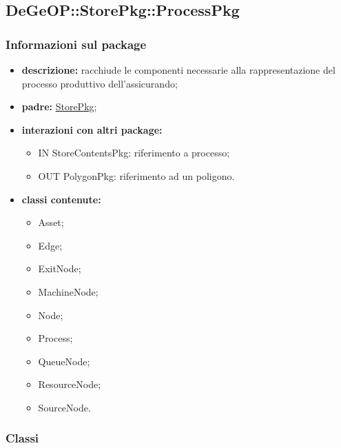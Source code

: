 \subsection{DeGeOP::StorePkg::ProcessPkg}
\label{pkg::ProcessPkg}
\subsubsection{Informazioni sul package}
\begin{itemize}
	\item \textbf{descrizione:} racchiude le componenti necessarie alla rappresentazione del processo produttivo dell'assicurando;
	\item \textbf{padre:} \hyperref[pkg::StorePkg]{StorePkg};
	\item \textbf{interazioni con altri package:} 
	\begin{itemize}
		\item IN StoreContentsPkg: riferimento a processo;
		\item OUT PolygonPkg: riferimento ad un poligono.
	\end{itemize}
	\item \textbf{classi contenute:}
	\begin{itemize}
		\item Asset;
		\item Edge;
		\item ExitNode;
		\item MachineNode;
		\item Node;
		\item Process;
		\item QueueNode;
		\item ResourceNode;
		\item SourceNode.
	\end{itemize}
\end{itemize}
\subsubsection{Classi}
